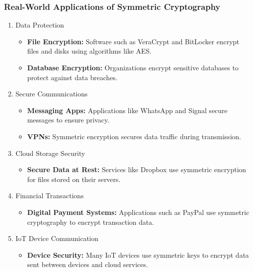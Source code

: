 \documentclass{beamer}
\begin{document}
\begin{frame}[fragile]
    \frametitle{Real-World Applications of Symmetric Cryptography}
    \begin{enumerate}
        \item Data Protection
        \begin{itemize}
            \item \textbf{File Encryption:} Software such as VeraCrypt and BitLocker encrypt files and disks using algorithms like AES.
            \item \textbf{Database Encryption:} Organizations encrypt sensitive databases to protect against data breaches.
        \end{itemize}
        
        \item Secure Communications
        \begin{itemize}
            \item \textbf{Messaging Apps:} Applications like WhatsApp and Signal secure messages to ensure privacy.
            \item \textbf{VPNs:} Symmetric encryption secures data traffic during transmission.
        \end{itemize}
        
        \item Cloud Storage Security
        \begin{itemize}
            \item \textbf{Secure Data at Rest:} Services like Dropbox use symmetric encryption for files stored on their servers.
        \end{itemize}
        
        \item Financial Transactions
        \begin{itemize}
            \item \textbf{Digital Payment Systems:} Applications such as PayPal use symmetric cryptography to encrypt transaction data.
        \end{itemize}
        
        \item IoT Device Communication
        \begin{itemize}
            \item \textbf{Device Security:} Many IoT devices use symmetric keys to encrypt data sent between devices and cloud services.
        \end{itemize}
    \end{enumerate}
\end{frame}
\end{document}

